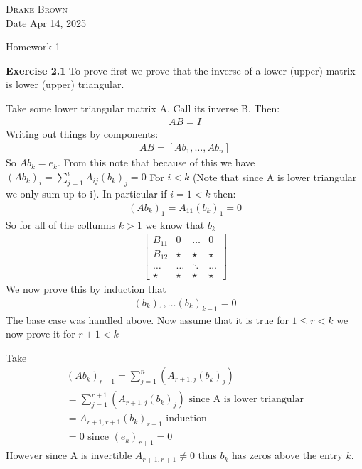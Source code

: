 \documentclass[12pt]{article}
\newenvironment{exercise}[1]{\vspace{.1in}\noindent\textbf{Exercise #1 \hspace{.05em}}}{}
\begin{document}
\DeclarePairedDelimiter\floor{\lfloor}{\rfloor}
\DeclarePairedDelimiter\ceil{\lceil}{\rceil}


\begin{flushright}
	\textsc{Drake Brown}  \\
	Date Apr 14, 2025
\end{flushright}
\begin{center}
	Homework 1
\end{center}

\begin{exercise}{2.1}
	To prove first we prove that the inverse of a lower (upper) matrix is lower (upper) triangular.

	Take some lower triangular matrix A. Call its inverse B. Then:
	\begin{align}
		AB=I
	\end{align}
	Writing out things by components:
	\begin{align}
		AB=[Ab_1,\dots, Ab_n]
	\end{align}
	So $Ab_k=e_k$. From this note that because of this we have $(Ab_k)_i=\sum_{j=1}^{i}A_{ij}(b_k)_j=0$  For $i< k$ (Note that since A is lower triangular we only sum up to i). In particular if $i=1<k$ then:
	\begin{align}
		(Ab_k)_1=A_{11}(b_k)_1=0
	\end{align}
	So for all of the collumns $k>1$ we know that $b_k$
	\begin{align}
		\begin{bmatrix}
			B_{11} & 0     & \dots  & 0     \\
			B_{12} & \star & \star  & \star \\
			\dots  & \dots & \ddots & \dots \\
			\star  & \star & \star  & \star
		\end{bmatrix}
	\end{align}
	We now prove this by induction that
	\begin{align}
		(b_{k})_1,\dots (b_{k})_{k-1}=0
	\end{align}
	The base case was handled above. Now assume that it is true for $1\leq r<k$ we now prove it for $r+1<k$

	Take
	\begin{align}
		(Ab_k)_{r+1}=\sum_{j=1}^{n}(A_{r+1,j}(b_k)_j)                           \\
		=\sum_{j=1}^{r+1}(A_{r+1,j}(b_k)_j) \text{ since A is lower triangular} \\
		=A_{r+1,r+1}(b_k)_{r+1}\text{ induction}                                \\
		=0 \text{ since }(e_k)_{r+1}=0
	\end{align}
	However since A is invertible $A_{r+1,r+1}\neq 0$ thus $b_{k}$ has zeros above the entry $k$.


\end{exercise}
\end{document}
